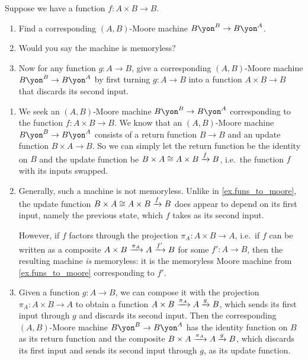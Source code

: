 \documentclass[Book-Poly]{subfiles}
\begin{document}
\begin{exercise}\label{exc.funs_to_moore}
Suppose we have a function $f\colon A\times B\to B$.
\begin{enumerate}
	\item Find a corresponding $(A,B)$-Moore machine $B\yon^B\to B\yon^A$.
	\item Would you say the machine is memoryless?
	\item Now for any function $g\colon A\to B$, give a corresponding $(A,B)$-Moore machine $B\yon^B\to B\yon^A$ by first turning $g\colon A\to B$ into a function $A\times B\to B$ that discards its second input.
\qedhere
\end{enumerate}
\begin{solution}
\begin{enumerate}
    \item We seek an $(A,B)$-Moore machine $B\yon^B\to B\yon^A$ corresponding to the function $f\colon A\times B\to B$.
    We know that an $(A,B)$-Moore machine $B\yon^B \to B\yon^A$ consists of a return function $B \to B$ and an update function $B \times A \to B$.
    So we can simply let the return function be the identity on $B$ and the update function be $B \times A \cong A \times B \xrightarrow{f} B$, i.e.\ the function $f$ with its inputs swapped.
    
    \item Generally, such a machine is not memoryless.
    Unlike in \cref{ex.funs_to_moore}, the update function $B \times A \cong A \times B \xrightarrow{f} B$ does appear to depend on its first input, namely the previous state, which $f$ takes as its second input.
    
    However, if $f$ factors through the projection $\pi_A \colon A \times B \to A$, i.e.\ if $f$ can be written as a composite $A \times B \xrightarrow{\pi_A} A \xrightarrow{f'} B$ for some $f' \colon A \to B$, then the resulting machine \emph{is} memoryless: it is the memoryless Moore machine from \cref{ex.funs_to_moore} corresponding to $f'$.
    
    \item Given a function $g\colon A\to B$, we can compose it with the projection $\pi_A\colon A\times B\to A$ to obtain a function $A\times B\xrightarrow{\pi_A}A\xrightarrow{g}B$, which sends its first input through $g$ and discards its second input.
    Then the corresponding $(A,B)$-Moore machine $B\yon^B \to B\yon^A$ has the identity function on $B$ as its return function and the composite $B\times A\xrightarrow{\pi_A}A\xrightarrow{g}B$, which discards its first input and sends its second input through $g$, as its update function.
\end{enumerate}
\end{solution}
\end{exercise}
\end{document}
